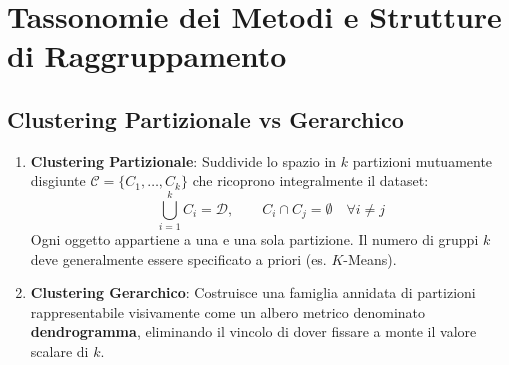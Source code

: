 \FloatBarrier
\section{Tassonomie dei Metodi e Strutture di Raggruppamento}
\label{sec:dm-clustering-taxonomies}

\FloatBarrier
\subsection{Clustering Partizionale vs Gerarchico}
\begin{enumerate}
    \item \textbf{Clustering Partizionale}: Suddivide lo spazio in $k$ partizioni mutuamente disgiunte $\mathcal{C} = \{C_1, \dots, C_k\}$ che ricoprono integralmente il dataset:
    \begin{equation}
        \bigcup_{i=1}^k C_i = \mathcal{D}, \qquad C_i \cap C_j = \emptyset \quad \forall i \neq j
    \end{equation}
    Ogni oggetto appartiene a una e una sola partizione. Il numero di gruppi $k$ deve generalmente essere specificato a priori (es. $K$-Means).
    \item \textbf{Clustering Gerarchico}: Costruisce una famiglia annidata di partizioni rappresentabile visivamente come un albero metrico denominato \textbf{dendrogramma}, eliminando il vincolo di dover fissare a monte il valore scalare di $k$.
\end{enumerate}

